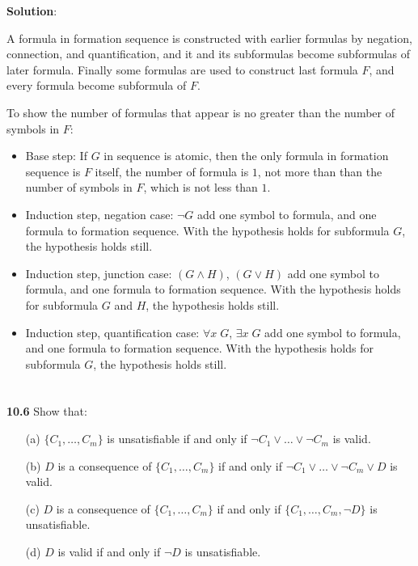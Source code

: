 \documentclass{ctexart}
\begin{document}
\textbf{Solution}:

A formula in formation sequence is constructed with earlier formulas by negation, connection, and
quantification, and it and its subformulas become subformulas of later formula. Finally some
formulas are used to construct last formula $F$, and every formula become subformula of $F$.

To show the number of formulas that appear is no greater than the number of symbols in $F$:
\begin{itemize}
	\item Base step: If $G$ in sequence is atomic, then the only formula in formation sequence is $F$ itself,
	the number of formula is $1$, not more than than the number of symbols in $F$, which is not less
	than $1$.
	
	\item Induction step, negation case: $\lnot G$ add one symbol to formula, and one formula to formation
	sequence. With the hypothesis holds for subformula $G$, the hypothesis holds still.
	
	\item Induction step, junction case: $(G \land H)$, $(G \lor H)$ add one symbol to formula, and one formula to formation
	sequence. With the hypothesis holds for subformula $G$ and $H$, the hypothesis holds still.
	
	\item Induction step, quantification case: $\forall x\; G$, $\exists x\; G$ add one symbol to formula, and one formula to formation
	sequence. With the hypothesis holds for subformula $G$, the hypothesis holds still.
\end{itemize}

\section*{}
\textbf{10.6} Show that:
\begin{itemize}
\item[(a)] $\{C_1 , \dots , C_m \}$ is unsatisfiable if and only if $\lnot C_1 \lor \dots \lor \lnot C_m$ is valid.
\item[(b)] $D$ is a consequence of $\{C_1 , \dots , C_m \}$ if and only if $\lnot C_1 \lor \dots \lor \lnot C_m \lor D$
is valid.
\item[(c)] $D$ is a consequence of $\{C_1 , \dots , C_m \}$ if and only if $\{C_1 , \dots , C_m, \lnot D\}$ is
unsatisfiable.
\item[(d)] $D$ is valid if and only if $\lnot D$ is unsatisfiable.
\end{itemize}
\end{document}
